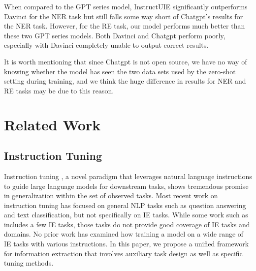 When compared to the GPT series model, InstructUIE significantly outperforms Davinci for the NER task but still falls some way short of Chatgpt's results for the NER task. However, for the RE task, our model performs much better than these two GPT series models. Both Davinci and Chatgpt perform poorly, especially with Davinci completely unable to output correct results.

It is worth mentioning that since Chatgpt is not open source, we have no way of knowing whether the model has seen the two data sets used by the zero-shot setting during training, and we think the huge difference in results for NER and RE tasks may be due to this reason.

\section{Related Work}

\subsection{Instruction Tuning}
Instruction tuning \cite{mishra-etal-2022-cross, wang-etal-2022-super, Longpre2023TheFC}, a novel paradigm that leverages natural language instructions to guide large language models for downstream tasks, shows tremendous promise in generalization within the set of observed tasks.
Most recent work \cite{wang-etal-2022-super,Longpre2023TheFC} on instruction tuning has focused on general NLP tasks such as question answering and text classification, but not specifically on IE tasks.
While some work such as \cite{Wang2022InstructionNERAM, parmar-etal-2022-boxbart} includes a few IE tasks, those tasks do not provide good coverage of IE tasks and domains. 
No prior work has examined how training a model on a wide range of IE tasks with various instructions.
In this paper, we propose a unified framework for information extraction that involves auxiliary task design as well as specific tuning methods.

